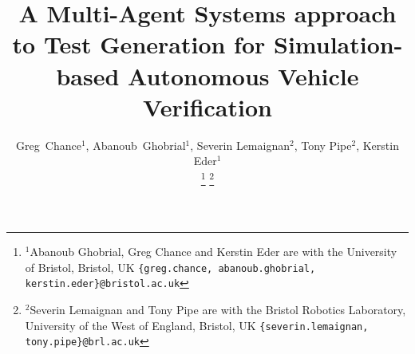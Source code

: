\documentclass[letterpaper, 10 pt, journal, twoside]{IEEEtran}
\begin{document}
\title{A Multi-Agent Systems approach to Test Generation for Simulation-based Autonomous Vehicle Verification}
\author{Greg~Chance$^{1}$, 
Abanoub~Ghobrial$^{1}$, 
Severin Lemaignan$^{2}$,
Tony Pipe$^{2}$,
Kerstin Eder$^{1}$%


\thanks{$^{1}$Abanoub Ghobrial, Greg Chance and Kerstin Eder are with the University of Bristol, Bristol, UK {\tt\footnotesize \{greg.chance, abanoub.ghobrial, kerstin.eder\}@bristol.ac.uk}}%
\thanks{$^{2}$Severin Lemaignan and Tony Pipe are with the Bristol Robotics Laboratory, University of the West of England, Bristol, UK {\tt\footnotesize \{severin.lemaignan, tony.pipe\}@brl.ac.uk}}%
}
\maketitle
\end{document}

